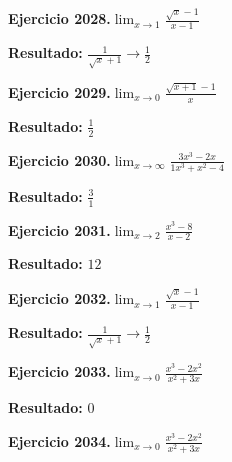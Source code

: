\documentclass[10pt,a4paper]{article}
\begin{document}
\begin{ejbox}
\textbf{Ejercicio 2028.}\quad $\lim_{x\to 1} \frac{\sqrt{x}-1}{x-1}$
\end{ejbox}

\begin{solbox}
\textbf{Resultado:} \(\displaystyle \frac{1}{\sqrt{x}+1} \to \frac{1}{2}\)
\end{solbox}

\begin{ejbox}
\textbf{Ejercicio 2029.}\quad $\lim_{x\to 0} \frac{\sqrt{x+1}-1}{x}$
\end{ejbox}

\begin{solbox}
\textbf{Resultado:} \(\displaystyle \frac{1}{2}\)
\end{solbox}

\newpage
\begin{ejbox}
\textbf{Ejercicio 2030.}\quad $\lim_{x\to \infty} \frac{3x^3 - 2x}{1x^3 + x^2 - 4}$
\end{ejbox}

\begin{solbox}
\textbf{Resultado:} \(\displaystyle \frac{3}{1}\)
\end{solbox}

\begin{ejbox}
\textbf{Ejercicio 2031.}\quad $\lim_{x\to 2} \frac{x^3-8}{x-2}$
\end{ejbox}

\begin{solbox}
\textbf{Resultado:} \(\displaystyle 12\)
\end{solbox}

\begin{ejbox}
\textbf{Ejercicio 2032.}\quad $\lim_{x\to 1} \frac{\sqrt{x}-1}{x-1}$
\end{ejbox}

\begin{solbox}
\textbf{Resultado:} \(\displaystyle \frac{1}{\sqrt{x}+1} \to \frac{1}{2}\)
\end{solbox}

\newpage
\begin{ejbox}
\textbf{Ejercicio 2033.}\quad $\lim_{x\to 0} \frac{x^3-2x^2}{x^2+3x}$
\end{ejbox}

\begin{solbox}
\textbf{Resultado:} \(\displaystyle 0\)
\end{solbox}

\begin{ejbox}
\textbf{Ejercicio 2034.}\quad $\lim_{x\to 0} \frac{x^3-2x^2}{x^2+3x}$
\end{ejbox}
\end{document}
